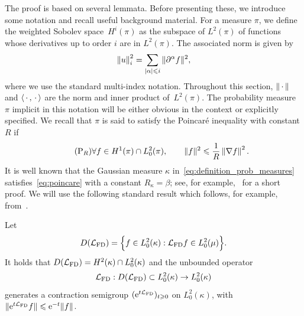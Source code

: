 \documentclass[11pt,a4paper]{article}
\begin{document}
The proof is based on several lemmata.
Before presenting these, we introduce some notation and recall useful background material.
For a measure $\pi$, we define the weighted Sobolev space~$H^i(\pi)$ as the subspace of $L^2(\pi)$
of functions whose derivatives up to order $i$ are in $L^2(\pi)$.
The associated norm is given by
\[
    \norm{u}_i^2 = \sum_{|\alpha| \leq i} \norm*{\partial^{\alpha} f}^2,
\]
where we use the standard multi-index notation.
Throughout this section, $\norm{\dummy}$ and $\ip{\dummy}{\dummy}$ are the norm and inner product of~$L^2(\pi)$.
The probability measure $\pi$ implicit in this notation will be either obvious in the context or explicitly specified.
We recall that $\pi$ is said to satisfy the Poincaré inequality with constant $R$ if
\begin{equation}
    \label{eq:poincare}
    \tag{P$_R$}
    \forall f \in H^1(\pi) \cap L^2_0(\pi), \qquad
    \norm*{f}^2 \leq \frac{1}{R} \norm{\grad f}^2.
\end{equation}
It is well known that the Gaussian measure $\kappa$ in~\eqref{eq:definition_prob_measures} satisfies~\eqref{eq:poincare} with a constant $R_{\kappa} = \beta$;
see, for example,~\cite[Lemma 2.1]{MR4071827} for a short proof.
We will use the following standard result which follows,
for example, from~\cite[Chapter 9]{lorenzi2006analytical}.
\begin{lemma}
    \label{lemma:semigroup}
    Let
    \[
        D(\mathcal L_{\rm FD}) = \Bigl\{ f \in L^2_0(\kappa): \mathcal L_{\rm FD} f \in L^2_0(\mu) \Bigr\}.
    \]
    It holds that $D(\mathcal L_{\rm FD}) = H^2(\kappa) \cap L^2_0(\kappa)$ and the unbounded operator
    \begin{equation}
        \label{eq:unbounded_operator}
        \mathcal L_{\rm FD}: D(\mathcal L_{\rm FD}) \subset L^2_0(\kappa) \to L^2_0(\kappa)
    \end{equation}
    generates a contraction semigroup $(\mathrm{e}^{t \mathcal L_{\rm FD}})_{t \geqslant 0}$ on $L^2_0(\kappa)$,
    with $\lVert \mathrm{e}^{t \mathcal L_{\rm FD}} f \rVert \leqslant \mathrm{e}^{-t} \lVert f \rVert$.
\end{lemma}
\end{document}
